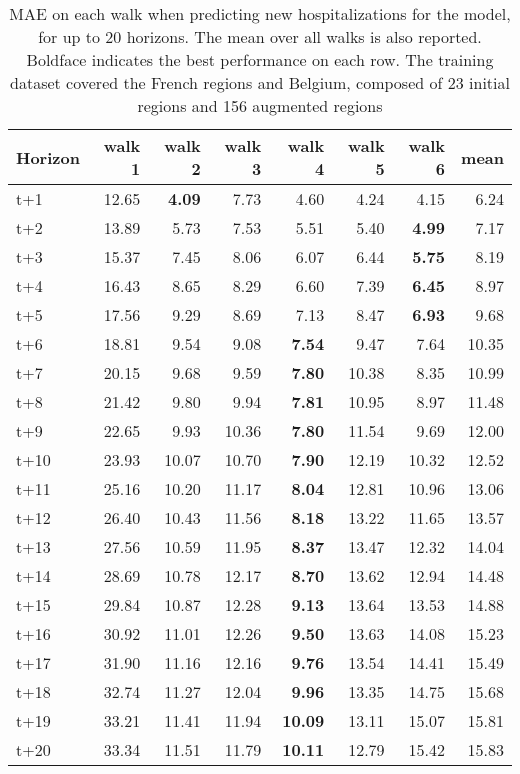 \begin{table}[H]
\centering
\caption{MAE on each walk when predicting new hospitalizations for the model, for up to 20 horizons. The mean over all walks is also reported. Boldface indicates the best performance on each row. The training dataset covered the French regions and Belgium, composed of 23 initial regions and 156 augmented regions }
\label{tab:MAE_walk_encoder_decoder}
\begin{tabular}{lrrrrrrr}
\toprule
Horizon &  walk 1 &  walk 2 &  walk 3 &  walk 4 &  walk 5 &  walk 6 &  mean \\
\midrule
t+1  & 12.65  & \textbf{4.09}  & 7.73  & 4.60  & 4.24  & 4.15  & 6.24  \\
t+2  & 13.89  & 5.73  & 7.53  & 5.51  & 5.40  & \textbf{4.99}  & 7.17  \\
t+3  & 15.37  & 7.45  & 8.06  & 6.07  & 6.44  & \textbf{5.75}  & 8.19  \\
t+4  & 16.43  & 8.65  & 8.29  & 6.60  & 7.39  & \textbf{6.45}  & 8.97  \\
t+5  & 17.56  & 9.29  & 8.69  & 7.13  & 8.47  & \textbf{6.93}  & 9.68  \\
t+6  & 18.81  & 9.54  & 9.08  & \textbf{7.54}  & 9.47  & 7.64  & 10.35  \\
t+7  & 20.15  & 9.68  & 9.59  & \textbf{7.80}  & 10.38  & 8.35  & 10.99  \\
t+8  & 21.42  & 9.80  & 9.94  & \textbf{7.81}  & 10.95  & 8.97  & 11.48  \\
t+9  & 22.65  & 9.93  & 10.36  & \textbf{7.80}  & 11.54  & 9.69  & 12.00  \\
t+10  & 23.93  & 10.07  & 10.70  & \textbf{7.90}  & 12.19  & 10.32  & 12.52  \\
t+11  & 25.16  & 10.20  & 11.17  & \textbf{8.04}  & 12.81  & 10.96  & 13.06  \\
t+12  & 26.40  & 10.43  & 11.56  & \textbf{8.18}  & 13.22  & 11.65  & 13.57  \\
t+13  & 27.56  & 10.59  & 11.95  & \textbf{8.37}  & 13.47  & 12.32  & 14.04  \\
t+14  & 28.69  & 10.78  & 12.17  & \textbf{8.70}  & 13.62  & 12.94  & 14.48  \\
t+15  & 29.84  & 10.87  & 12.28  & \textbf{9.13}  & 13.64  & 13.53  & 14.88  \\
t+16  & 30.92  & 11.01  & 12.26  & \textbf{9.50}  & 13.63  & 14.08  & 15.23  \\
t+17  & 31.90  & 11.16  & 12.16  & \textbf{9.76}  & 13.54  & 14.41  & 15.49  \\
t+18  & 32.74  & 11.27  & 12.04  & \textbf{9.96}  & 13.35  & 14.75  & 15.68  \\
t+19  & 33.21  & 11.41  & 11.94  & \textbf{10.09}  & 13.11  & 15.07  & 15.81  \\
t+20  & 33.34  & 11.51  & 11.79  & \textbf{10.11}  & 12.79  & 15.42  & 15.83  \\

\bottomrule
\end{tabular}
\end{table}
